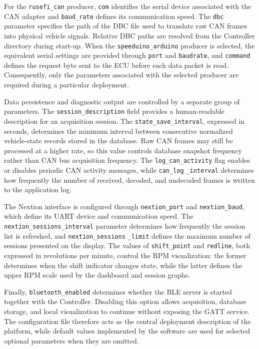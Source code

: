 For the \texttt{rusefi\_can} producer, \texttt{com} identifies the serial device associated with the CAN adapter and \texttt{baud\_rate} defines its communication speed. The \texttt{dbc} parameter specifies the path of the DBC file used to translate raw CAN frames into physical vehicle signals. Relative DBC paths are resolved from the Controller directory during start-up. When the \texttt{speeduino\_arduino} producer is selected, the equivalent serial settings are provided through \texttt{port} and \texttt{baudrate}, and \texttt{command} defines the request byte sent to the ECU before each data packet is read. Consequently, only the parameters associated with the selected producer are required during a particular deployment.

Data persistence and diagnostic output are controlled by a separate group of parameters. The \texttt{session\_description} field provides a human-readable description for an acquisition session. The \texttt{state\_save\_interval}, expressed in seconds, determines the minimum interval between consecutive normalized vehicle-state records stored in the database. Raw CAN frames may still be processed at a higher rate, so this value controls database snapshot frequency rather than CAN bus acquisition frequency. The \texttt{log\_can\_activity} flag enables or disables periodic CAN activity messages, while \texttt{can\_log} \texttt{\_interval} determines how frequently the number of received, decoded, and undecoded frames is written to the application log.

The Nextion interface is configured through \texttt{nextion\_port} and \texttt{nextion\_baud}, which define its UART device and communication speed. The \texttt{nextion\_sessions\_interval} parameter determines how frequently the session list is refreshed, and \texttt{nextion\_sessions} \texttt{\_limit} defines the maximum number of sessions presented on the display. The values of \texttt{shift\_point} and \texttt{redline}, both expressed in revolutions per minute, control the RPM visualization: the former determines when the shift indicator changes state, while the latter defines the upper RPM scale used by the dashboard and session graphs.

Finally, \texttt{bluetooth\_enabled} determines whether the BLE server is started together with the Controller. Disabling this option allows acquisition, database storage, and local visualization to continue without exposing the GATT service. The configuration file therefore acts as the central deployment description of the platform, while default values implemented by the software are used for selected optional parameters when they are omitted.

